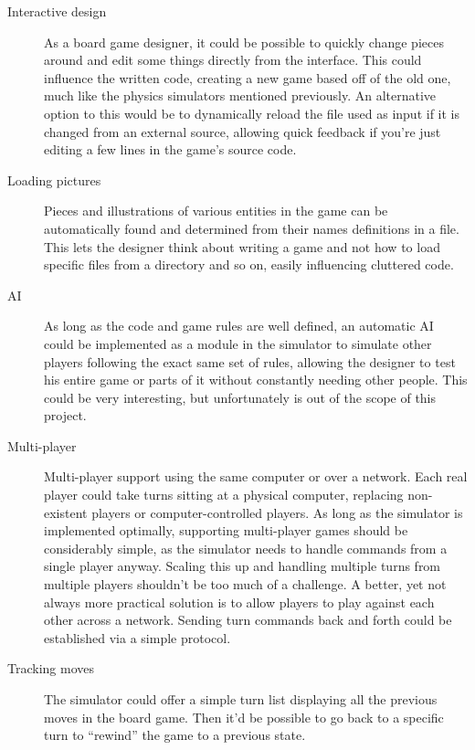 \begin{description}

  \item[Interactive design] As a board game designer, it could be
    possible to quickly change pieces around and edit some things directly
    from the interface. This could influence the written code, creating a
    new game based off of the old one, much like the physics simulators
    mentioned previously. An alternative option to this would be to
    dynamically reload the file used as input if it is changed from an
    external source, allowing quick feedback if you're just editing a few
    lines in the game's source code.

  \item[Loading pictures] Pieces and illustrations of various entities
    in the game can be automatically found and determined from their names
    definitions in a \productname{} file. This lets the designer think about
    writing a game and not how to load specific files from a directory and
    so on, easily influencing cluttered code.

  \item[AI] As long as the code and game rules are well defined, an
    automatic AI could be implemented as a module in the simulator to
    simulate other players following the exact same set of rules, allowing
    the designer to test his entire game or parts of it without constantly
    needing other people. This could be very interesting, but unfortunately
    is out of the scope of this project.

  \item[Multi-player] Multi-player support using the same computer
    or over a network. Each real player could take turns sitting at a
    physical computer, replacing non-existent players or computer-controlled
    players. As long as the simulator is implemented optimally, supporting
    multi-player games should be considerably simple, as the simulator
    needs to handle commands from a single player anyway. Scaling this up
    and handling multiple turns from multiple players shouldn't be too much
    of a challenge. A better, yet not always more practical solution is to
    allow players to play against each other across a network. Sending turn
    commands back and forth could be established via a simple protocol.

  \item[Tracking moves] The simulator could offer a simple turn list
    displaying all the previous moves in the board game. Then it'd be
    possible to go back to a specific turn to ``rewind'' the game to a
    previous state.
\end{description}

